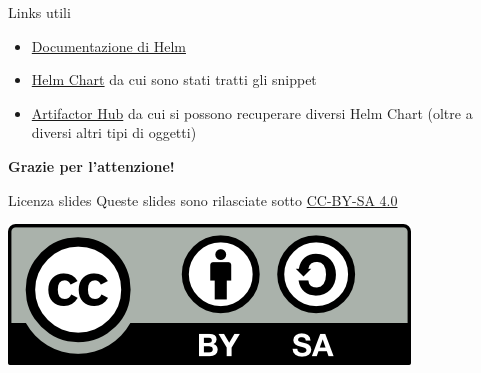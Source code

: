 \documentclass{beamer}
\begin{document}
\begin{frame}{Links utili}
\begin{itemize}
    \item \href{https://helm.sh/docs/}{Documentazione di Helm}
    \item \href{https://github.com/bitnami/charts/tree/main/bitnami/wordpress}{Helm Chart} da cui sono stati tratti gli snippet
    \item \href{https://artifacthub.io/}{Artifactor Hub} da cui si possono recuperare diversi Helm Chart (oltre a diversi altri tipi di oggetti)
\end{itemize}
\end{frame}
\begin{frame}{}
\centering \Large \textbf{Grazie per l'attenzione!}
\end{frame}

\begin{frame}{Licenza slides}
\centering
Queste slides sono rilasciate sotto \href{https://creativecommons.org/licenses/by-sa/4.0/}{CC-BY-SA 4.0}
\begin{center} \includegraphics{img/by-sa.png} \end{center}
\end{frame}
\end{document}
